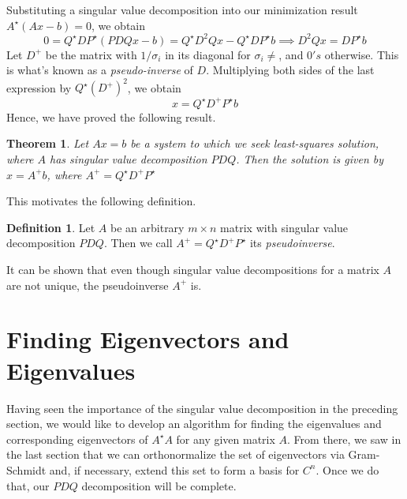 \documentclass[12pt]{article}
\theoremstyle{plain}
\newtheorem{theorem}{Theorem}
\theoremstyle{definition}
\newtheorem*{definition}{Definition}
\theoremstyle{remark}
\numberwithin{equation}{section}  %
\begin{document}
Substituting a singular value decomposition into our minimization result $A^{\star}(Ax - b) = 0$, 
we obtain
\begin{equation*}
	0 = Q^{\star} D P^{\star}(PDQx - b) = Q^{\star} D^{2} Qx - Q^{\star}D P^{\star}b \implies D^{2}Qx = DP^{\star}b
\end{equation*}
Let $D^{+}$ be the matrix with $1/\sigma_i$ in its diagonal
for $\sigma_i \neq$, and $0's$ otherwise. This is what's known as a \emph{pseudo-inverse} of $D$. 
Multiplying both sides of the last expression by $Q^{\star}(D^{+})^{2}$, we obtain
\begin{equation*}
	x =Q^{\star} D^{+} P^{\star} b  
\end{equation*}
Hence, we have proved the following result. 

\begin{theorem}
	Let $Ax = b$ be a system to which we seek least-squares solution, where
	$A$ has singular value decomposition $PDQ$.
	Then the solution is given by $x = A^{+}b$, where $A^{+} = Q^{\star} D^{+} P^{\star}$
\end{theorem}
This motivates the following definition.
\begin{definition}
	Let $A$ be an arbitrary $m \times n$ matrix with singular value decomposition $PDQ$. 
	Then we call $A^{+} = Q^{\star}D^{+} P^{\star}$ its \emph{pseudoinverse}.
\end{definition}
It can be shown that even though singular value decompositions for a matrix $A$ are not
unique, the pseudoinverse $A^{+}$ is. 
\section{Finding Eigenvectors and Eigenvalues}
Having seen the importance of the singular value decomposition in the preceding
section, we would like to develop an algorithm for finding the eigenvalues and
corresponding eigenvectors of $A^{\star}A$ for any given matrix $A$. From there,
we saw in the last section that we can orthonormalize the set of eigenvectors
via Gram-Schmidt and, if necessary, extend this set to form a basis for $C^{n}$.
Once we do that, our $PDQ$ decomposition will be complete.
\end{document}
